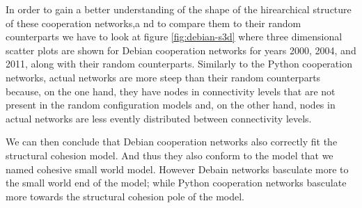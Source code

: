 In order to gain a better understanding of the shape of the hirearchical structure of these cooperation networks,a nd to compare them to their random counterparts we have to look at figure \ref{fig:debian-s3d} where three dimensional scatter plots are shown for Debian cooperation networks for years 2000, 2004, and 2011, along with their random counterparts. Similarly to the Python cooperation networks, actual networks are more steep than their random counterparts because, on the one hand, they have nodes in connectivity levels that are not present in the random configuration models and, on the other hand, nodes in actual networks are less evently distributed between connectivity levels.

We can then conclude that Debian cooperation networks also correctly fit the structural cohesion model. And thus they also conform to the model that we named cohesive small world model. However Debain networks basculate more to the small world end of the model; while Python cooperation networks basculate more towards the structural cohesion pole of the model.  


